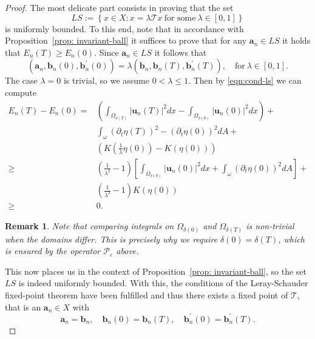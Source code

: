 \documentclass[10pt,a4paper]{article}
\newtheorem{remark}[theorem]{Remark}
\numberwithin{equation}{section}
\begin{document}
\begin{proof}
The most delicate part consists in proving that the set 
\[LS:=\left\{ x\in X:x=\lambda\mathcal{T}x\ \text{for some}\ \lambda\in\left[0,1\right]\right\} 
\] is uniformly bounded. 
To this end, note that in accordance with Proposition~\ref{prop: invariant-ball} it suffices to prove that for any $\mathbf{a}_{n}\in LS$ it holds that $E_{n}\left(T\right)\ge E_{n}\left(0\right)$. 
Since $\mathbf{a}_{n} \in LS$ it follows that 
\begin{equation}\label{eqn:cond-ls}
\left(\mathbf{a}_{n},\mathbf{b}_{n}\left(0\right),\mathbf{b}_{n}^{\prime}\left(0\right)\right)=\lambda\left(\mathbf{b}_{n},\mathbf{b}_{n}\left(T\right),\mathbf{b}_{n}^{\prime}\left(T\right)\right),\quad\text{for}\ \lambda\in\left[0,1\right].
\end{equation}
The case $\lambda=0$ is trivial, so we assume $0<\lambda \le 1$.
Then by  \eqref{eqn:cond-ls} we can compute
\begin{equation}\begin{aligned}E_{n}\left(T\right)-E_{n}\left(0\right)= & \left(\int_{\Omega_{\delta\left(T\right)}}\left|\mathbf{u}_{n}\left(T\right)\right|^{2}dx-\int_{\Omega_{\delta\left(0\right)}}\left|\mathbf{u}_{n}\left(0\right)\right|^{2}dx\right)+\\
 & \int_{\omega}\left(\partial_{t}\eta\left(T\right)\right)^{2}-\left(\partial_{t}\eta\left(0\right)\right)^{2}dA+\\
 & \left(K\left(\frac{1}{\lambda}\eta\left(0\right)\right)-K\left(\eta\left(0\right)\right)\right)\\
\ge & \left(\frac{1}{\lambda^{2}}-1\right)\left[\int_{\Omega_{\delta\left(0\right)}}\left|\mathbf{u}_{n}\left(0\right)\right|^{2}dx+\int_{\omega}\left(\partial_{t}\eta\left(0\right)\right)^{2}dA\right]+\\
 & \left(\frac{1}{\lambda^{2}}-1\right)K\left(\eta\left(0\right)\right)\\
\ge & 0.
\end{aligned}
\end{equation}

\begin{remark}
Note that comparing integrals on $\Omega_{\delta(0)}$ and $\Omega_{\delta(T)}$ is non-trivial when the domains differ. This is precisely why we require $\delta(0)=\delta(T)$, which is ensured by the operator $\mathcal{P}_{\varepsilon}$ above.
\end{remark}

This now places us in the context of Proposition~\ref{prop: invariant-ball}, so the set $LS$ is indeed uniformly bounded. With this, the conditions of the Leray-Schauder fixed-point theorem have been fulfilled and thus there exists a  fixed point of $\mathcal{T}$, that is an $\mathbf{a}_{n} \in X$ with 
\[\mathbf{a}_{n}=\mathbf{b}_{n},\quad\mathbf{b}_{n}\left(0\right)=\mathbf{b}_{n}\left(T\right),\quad\mathbf{b}_{n}^{\prime}\left(0\right)=\mathbf{b}_{n}^{\prime}\left(T\right).\]
\end{proof}
\end{document}
